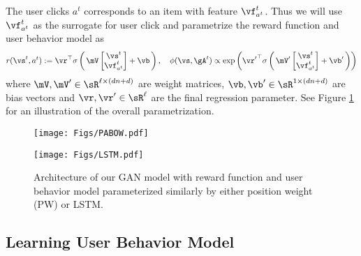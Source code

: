\documentclass{article} %
\newcommand{\Li}[1]{{\color{cyan}{\bf\sf [Li: #1]}}}
\begin{document}
The user clicks $a^t$ corresponds to an item with feature $\vf_{a^t}^t$. Thus we will use $\vf_{a^t}^t$ as the surrogate for user click and parametrize the reward function and user behavior model as
{\small \begin{equation}
    r(\vs^t, a^t) := \vr^\top \sigma \left(\, \mV \left[
    \begin{matrix}
        \vs^t \cr
        \vf_{a^t}^t
    \end{matrix}
    \right] + \vb \, \right),~~~
    \phi(\vs,\gA^t) \propto \exp\left(
    {\vr'}^{\top} \sigma \left(\, \mV' \left[
    \begin{matrix}
        \vs^t \cr
        \vf_{a^t}^t
    \end{matrix}
    \right] + \vb' \, \right)
    \right)
\end{equation}}
where $\mV,\mV' \in \sR^{\ell \times (dn+d)}$ are weight matrices, $\vb,\vb' \in \sR^{ 1 \times (dn+d)}$ are bias vectors and $\vr,\vr' \in \sR^{\ell}$ are the final regression parameter. See Figure \ref{fg:usermodel} for an illustration of the overall parametrization. \Li{It seems that $\vr'$ here is used as the parameters of neural network, which is easy to cause misunderstanding with the reward function $r$ despite they are two different notations.}
\begin{figure}[htbp]
    \vspace{-3mm}
  \begin{minipage}[c]{0.53\textwidth}
    \centering
    \texttt{[image: Figs/PABOW.pdf]}
  \end{minipage}
  \begin{minipage}[c]{0.42\textwidth}
    \centering
    \texttt{[image: Figs/LSTM.pdf]}
  \end{minipage}\hfill
    \vspace{-3mm}
  \caption{\small Architecture of our GAN model with reward function and user behavior model parameterized similarly by either position weight (PW) or LSTM.
    }
    \label{fg:usermodel}
    \vspace{-3mm}
\end{figure}

\vspace{-3mm}
\subsection{Learning User Behavior Model}
\vspace{-3mm}
\end{document}

